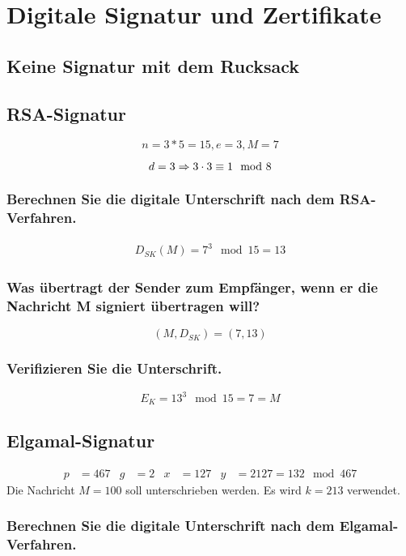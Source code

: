 \section{Digitale Signatur und Zertifikate}

\subsection{Keine Signatur mit dem Rucksack}

\subsection{RSA-Signatur}
	\[n = 3 * 5 = 15, e = 3, M = 7\]
	
   \[ d = 3 \Rightarrow 3 \cdot 3 \equiv 1 \mod 8 \]	
	
\subsubsection{Berechnen Sie die digitale Unterschrift nach dem RSA-Verfahren.}

\begin{align}
	D_{SK}(M) = 7^{3} \mod 15 = 13
\end{align}

\subsubsection{Was übertragt der Sender zum Empfänger, wenn er die Nachricht M signiert übertragen will?}
	
	\[ (M,D_{SK}) = (7,13) \]

\subsubsection{Verifizieren Sie die Unterschrift.}

\[ E_{K} = 13^{3} \mod 15 = 7 = M \]


\subsection{Elgamal-Signatur}
\begin{align} 
  p &= 467 & g  &= 2 & x &= 127 & y &= 2127 = 132 \mod 467
\end{align}
Die Nachricht $M = 100$ soll unterschrieben werden. Es wird $k = 213$ verwendet.
\subsubsection{Berechnen Sie die digitale Unterschrift nach dem Elgamal-Verfahren.}

